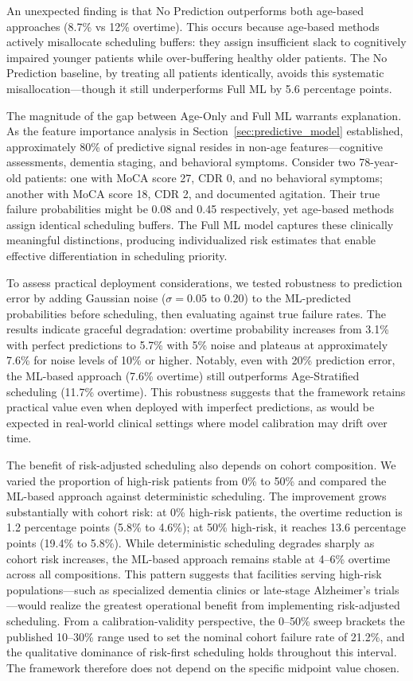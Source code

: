 \documentclass[11pt,a4paper]{article}
\begin{document}
An unexpected finding is that No Prediction outperforms both age-based approaches (8.7\% vs 12\% overtime). This occurs because age-based methods actively misallocate scheduling buffers: they assign insufficient slack to cognitively impaired younger patients while over-buffering healthy older patients. The No Prediction baseline, by treating all patients identically, avoids this systematic misallocation---though it still underperforms Full ML by 5.6 percentage points.

The magnitude of the gap between Age-Only and Full ML warrants explanation. As the feature importance analysis in Section~\ref{sec:predictive_model} established, approximately 80\% of predictive signal resides in non-age features---cognitive assessments, dementia staging, and behavioral symptoms. Consider two 78-year-old patients: one with MoCA score 27, CDR 0, and no behavioral symptoms; another with MoCA score 18, CDR 2, and documented agitation. Their true failure probabilities might be 0.08 and 0.45 respectively, yet age-based methods assign identical scheduling buffers. The Full ML model captures these clinically meaningful distinctions, producing individualized risk estimates that enable effective differentiation in scheduling priority.

To assess practical deployment considerations, we tested robustness to prediction error by adding Gaussian noise ($\sigma = 0.05$ to $0.20$) to the ML-predicted probabilities before scheduling, then evaluating against true failure rates. The results indicate graceful degradation: overtime probability increases from 3.1\% with perfect predictions to 5.7\% with 5\% noise and plateaus at approximately 7.6\% for noise levels of 10\% or higher. Notably, even with 20\% prediction error, the ML-based approach (7.6\% overtime) still outperforms Age-Stratified scheduling (11.7\% overtime). This robustness suggests that the framework retains practical value even when deployed with imperfect predictions, as would be expected in real-world clinical settings where model calibration may drift over time.

The benefit of risk-adjusted scheduling also depends on cohort composition. We varied the proportion of high-risk patients from 0\% to 50\% and compared the ML-based approach against deterministic scheduling. The improvement grows substantially with cohort risk: at 0\% high-risk patients, the overtime reduction is 1.2 percentage points (5.8\% to 4.6\%); at 50\% high-risk, it reaches 13.6 percentage points (19.4\% to 5.8\%). While deterministic scheduling degrades sharply as cohort risk increases, the ML-based approach remains stable at 4--6\% overtime across all compositions. This pattern suggests that facilities serving high-risk populations---such as specialized dementia clinics or late-stage Alzheimer's trials---would realize the greatest operational benefit from implementing risk-adjusted scheduling. From a calibration-validity perspective, the 0--50\% sweep brackets the published 10--30\% range used to set the nominal cohort failure rate of 21.2\%, and the qualitative dominance of risk-first scheduling holds throughout this interval. The framework therefore does not depend on the specific midpoint value chosen.
\end{document}
